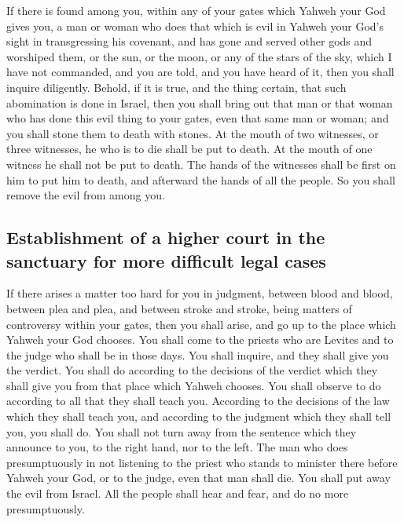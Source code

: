  If there is found among you, within any of your gates
which Yahweh your God gives you, a man or woman who does that which is
evil in Yahweh your God's sight in transgressing his covenant,
 and has gone and served other gods and worshiped them, or
the sun, or the moon, or any of the stars of the sky, which I have not
commanded,  and you are told, and you have heard of it,
then you shall inquire diligently. Behold, if it is true, and the thing
certain, that such abomination is done in Israel,  then
you shall bring out that man or that woman who has done this evil thing
to your gates, even that same man or woman; and you shall stone them to
death with stones.  At the mouth of two witnesses, or
three witnesses, he who is to die shall be put to death. At the mouth of
one witness he shall not be put to death.  The hands of
the witnesses shall be first on him to put him to death, and afterward
the hands of all the people. So you shall remove the evil from among
you.

\hypertarget{establishment-of-a-higher-court-in-the-sanctuary-for-more-difficult-legal-cases}{%
\subsection{Establishment of a higher court in the sanctuary for more
difficult legal
cases}\label{establishment-of-a-higher-court-in-the-sanctuary-for-more-difficult-legal-cases}}

 If there arises a matter too hard for you in judgment,
between blood and blood, between plea and plea, and between stroke and
stroke, being matters of controversy within your gates, then you shall
arise, and go up to the place which Yahweh your God chooses.
 You shall come to the priests who are Levites and to the
judge who shall be in those days. You shall inquire, and they shall give
you the verdict.  You shall do according to the decisions
of the verdict which they shall give you from that place which Yahweh
chooses. You shall observe to do according to all that they shall teach
you.  According to the decisions of the law which they
shall teach you, and according to the judgment which they shall tell
you, you shall do. You shall not turn away from the sentence which they
announce to you, to the right hand, nor to the left.  The
man who does presumptuously in not listening to the priest who stands to
minister there before Yahweh your God, or to the judge, even that man
shall die. You shall put away the evil from Israel.  All
the people shall hear and fear, and do no more presumptuously.

